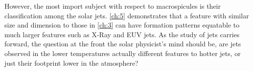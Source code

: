 However, the most import subject with respect to macrospicules is their classification among the solar jets. 
\cref{ch:5} demonstrates that a feature with similar size and dimension to those in \cref{ch:3} can have formation patterns equatable to much larger features such as X-Ray and EUV jets.
As the study of jets carries forward, the question at the front the solar physicist's mind should be, are jets observed in the lower temperatures actually different features to hotter jets, or just their footprint lower in the atmosphere?


 


